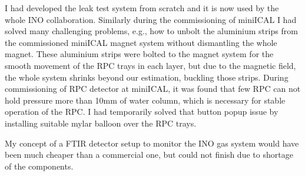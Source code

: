 \documentclass[12pt]{article}
\begin{document}
\begin{minipage}{1.05\textwidth}
\hspace{0.5cm}
I had developed the leak test system from scratch and it is now
used by the whole INO collaboration. Similarly during the
commissioning of miniICAL I had solved many challenging problems,
e.g., how to unbolt the aluminium strips from the commissioned
miniICAL magnet system without dismantling the whole magnet.
These aluminium strips were bolted to the
magnet system for the smooth movement of the RPC trays in each layer,
but due to the magnetic field, the whole system shrinks beyond our
estimation, buckling those strips.
During commissioning of RPC detector at miniICAL, it was found that
few RPC can not hold pressure more than 10mm of water column, which is
necessary for stable operation of the RPC. I had temporarily
solved that button popup issue by installing suitable mylar balloon
over the RPC trays.

\hspace{0.5cm}
My concept of a FTIR detector setup to
monitor the INO gas system would have been much cheaper than a
commercial one, but could not finish due to shortage of the components.






\end{minipage}
\end{document}

